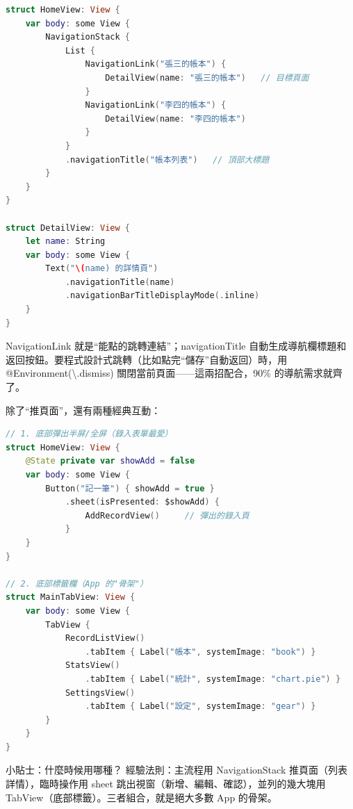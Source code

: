 \begin{lstlisting}[language=Swift]
struct HomeView: View {
    var body: some View {
        NavigationStack {
            List {
                NavigationLink("張三的帳本") {
                    DetailView(name: "張三的帳本")   // 目標頁面
                }
                NavigationLink("李四的帳本") {
                    DetailView(name: "李四的帳本")
                }
            }
            .navigationTitle("帳本列表")   // 頂部大標題
        }
    }
}

struct DetailView: View {
    let name: String
    var body: some View {
        Text("\(name) 的詳情頁")
            .navigationTitle(name)
            .navigationBarTitleDisplayMode(.inline)
    }
}
\end{lstlisting}

NavigationLink 就是“能點的跳轉連結”；navigationTitle 自動生成導航欄標題和返回按鈕。要程式設計式跳轉（比如點完“儲存”自動返回）時，用 @Environment(\textbackslash{}.dismiss) 關閉當前頁面——這兩招配合，90\% 的導航需求就齊了。


除了“推頁面”，還有兩種經典互動：

\begin{lstlisting}[language=Swift]
// 1. 底部彈出半屏/全屏（錄入表單最愛）
struct HomeView: View {
    @State private var showAdd = false
    var body: some View {
        Button("記一筆") { showAdd = true }
            .sheet(isPresented: $showAdd) {
                AddRecordView()     // 彈出的錄入頁
            }
    }
}

// 2. 底部標籤欄（App 的"骨架"）
struct MainTabView: View {
    var body: some View {
        TabView {
            RecordListView()
                .tabItem { Label("帳本", systemImage: "book") }
            StatsView()
                .tabItem { Label("統計", systemImage: "chart.pie") }
            SettingsView()
                .tabItem { Label("設定", systemImage: "gear") }
        }
    }
}
\end{lstlisting}

\begin{tcbinfo}{小貼士：什麼時候用哪種？}
經驗法則：主流程用 NavigationStack 推頁面（列表詳情），臨時操作用 sheet 跳出視窗（新增、編輯、確認），並列的幾大塊用 TabView（底部標籤）。三者組合，就是絕大多數 App 的骨架。

\end{tcbinfo}


